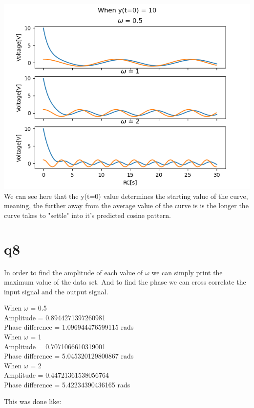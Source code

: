 \documentclass[a4paper,english]{article}
\begin{document}
        \includegraphics[scale=0.74]{q6_6_t10.png}\\
        We can see here that the y(t=0) value determines the starting value of the curve, meaning, the further away from the average
        value of the curve is is the longer the curve takes to "settle" into it's predicted cosine pattern.
    \section{q8}
        In order to find the amplitude of each value of $\omega$ we can simply print the maximum value of the data set.
        And to find the phase we can cross correlate the input signal and the output signal.
        \begin{center}
            When $\omega$ = 0.5\\
            Amplitude = 0.8944271397260981\\
            Phase difference = 1.096944476599115 rads\\
            \medskip
            When $\omega$ = 1\\
            Amplitude = 0.7071066610319001\\
            Phase difference = 5.045320129800867 rads\\
            \medskip
            When $\omega$ = 2\\
            Amplitude = 0.44721361538056764\\
            Phase difference = 5.42234390436165 rads\\
        \end{center}
        This was done like:
        
\end{document}

